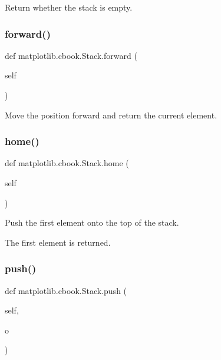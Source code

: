 \begin{DoxyVerb}Return whether the stack is empty.\end{DoxyVerb}
 \mbox{\label{classmatplotlib_1_1cbook_1_1Stack_ac3b9a658495cab11c0870fedc4c8af03}} 
\subsubsection{\texorpdfstring{forward()}{forward()}}
{\footnotesize\ttfamily def matplotlib.\+cbook.\+Stack.\+forward (\begin{DoxyParamCaption}\item[{}]{self }\end{DoxyParamCaption})}

\begin{DoxyVerb}Move the position forward and return the current element.\end{DoxyVerb}
 \mbox{\label{classmatplotlib_1_1cbook_1_1Stack_a58110f1be0b524650b7d0e79bff36f55}} 
\subsubsection{\texorpdfstring{home()}{home()}}
{\footnotesize\ttfamily def matplotlib.\+cbook.\+Stack.\+home (\begin{DoxyParamCaption}\item[{}]{self }\end{DoxyParamCaption})}

\begin{DoxyVerb}Push the first element onto the top of the stack.

The first element is returned.
\end{DoxyVerb}
 \mbox{\label{classmatplotlib_1_1cbook_1_1Stack_ac6331babc43dbdd56efc6cf378af87ca}} 
\subsubsection{\texorpdfstring{push()}{push()}}
{\footnotesize\ttfamily def matplotlib.\+cbook.\+Stack.\+push (\begin{DoxyParamCaption}\item[{}]{self,  }\item[{}]{o }\end{DoxyParamCaption})}

